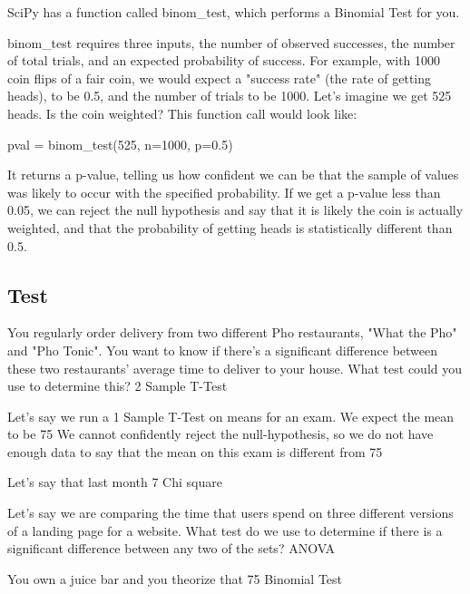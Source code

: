\documentclass{journal}
\begin{document}
SciPy has a function called binom_test, which performs a Binomial Test for you.

binom_test requires three inputs, the number of observed successes, the number of total trials, and an expected probability of success. For example, with 1000 coin flips of a fair coin, we would expect a "success rate" (the rate of getting heads), to be 0.5, and the number of trials to be 1000. Let's imagine we get 525 heads. Is the coin weighted? This function call would look like:

pval = binom_test(525, n=1000, p=0.5)

It returns a p-value, telling us how confident we can be that the sample of values was likely to occur with the specified probability. If we get a p-value less than 0.05, we can reject the null hypothesis and say that it is likely the coin is actually weighted, and that the probability of getting heads is statistically different than 0.5.

\subsection{Test}
You regularly order delivery from two different Pho restaurants, "What the Pho" and "Pho Tonic". You want to know if there's a significant difference between these two restaurants' average time to deliver to your house. What test could you use to determine this?
2 Sample T-Test


Let's say we run a 1 Sample T-Test on means for an exam. We expect the mean to be 75%
We cannot confidently reject the null-hypothesis, so we do not have enough data to say that the mean on this exam is different from 75%


Let's say that last month 7%
Chi square


Let's say we are comparing the time that users spend on three different versions of a landing page for a website. What test do we use to determine if there is a significant difference between any two of the sets?
ANOVA

You own a juice bar and you theorize that 75%
Binomial Test
\end{document}
